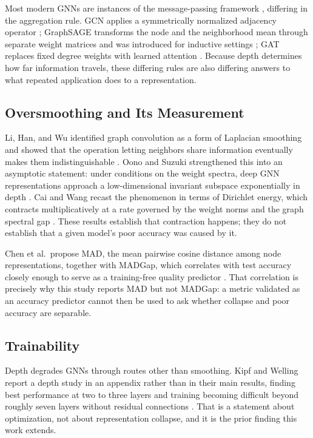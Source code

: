 \documentclass[
  conference]{IEEEtran}
\begin{document}
Most modern GNNs are instances of the message-passing framework
\citep{gilmer2017neural}, differing in the aggregation rule. GCN applies
a symmetrically normalized adjacency operator \citep{kipf2017semi};
GraphSAGE transforms the node and the neighborhood mean through separate
weight matrices and was introduced for inductive settings
\citep{hamilton2017inductive}; GAT replaces fixed degree weights with
learned attention \citep{velickovic2018graph}. Because depth determines
how far information travels, these differing rules are also differing
answers to what repeated application does to a representation.

\subsection{Oversmoothing and Its
Measurement}\label{oversmoothing-and-its-measurement}

Li, Han, and Wu identified graph convolution as a form of Laplacian
smoothing and showed that the operation letting neighbors share
information eventually makes them indistinguishable
\citep{li2018deeper}. Oono and Suzuki strengthened this into an
asymptotic statement: under conditions on the weight spectra, deep GNN
representations approach a low-dimensional invariant subspace
exponentially in depth \citep{oono2020graph}. Cai and Wang recast the
phenomenon in terms of Dirichlet energy, which contracts
multiplicatively at a rate governed by the weight norms and the graph
spectral gap \citep{cai2020note}. These results establish that
contraction happens; they do not establish that a given model's poor
accuracy was caused by it.

Chen et al.~propose MAD, the mean pairwise cosine distance among node
representations, together with MADGap, which correlates with test
accuracy closely enough to serve as a training-free quality predictor
\citep{chen2020measuring}. That correlation is precisely why this study
reports MAD but not MADGap: a metric validated as an accuracy predictor
cannot then be used to ask whether collapse and poor accuracy are
separable.

\subsection{Trainability}\label{trainability}

Depth degrades GNNs through routes other than smoothing. Kipf and
Welling report a depth study in an appendix rather than in their main
results, finding best performance at two to three layers and training
becoming difficult beyond roughly seven layers without residual
connections \citep{kipf2017semi}. That is a statement about
optimization, not about representation collapse, and it is the prior
finding this work extends.
\end{document}
